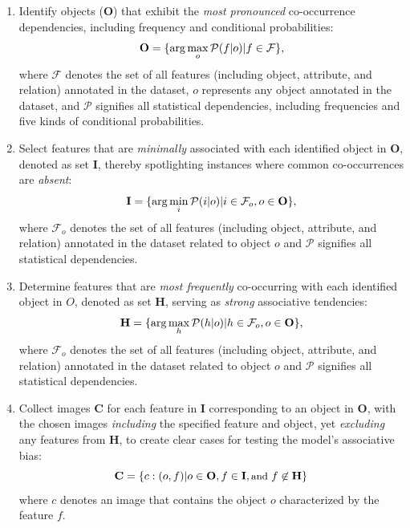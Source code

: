 \begin{enumerate}
    \item Identify objects ($\mathbf{O}$) that exhibit the \textit{most pronounced} co-occurrence dependencies, including frequency and conditional probabilities:
    \begin{equation}
        \small
        \mathbf{O} = \{\arg \max_{o} \mathcal{P}(f|o) | f \in \mathcal{F}\},
    \end{equation}
    where $\mathcal{F}$ denotes the set of all features (including object, attribute, and relation) annotated in the dataset, $o$ represents any object annotated in the dataset, and $\mathcal{P}$ signifies all statistical dependencies, including frequencies and five kinds of conditional probabilities.
    
    \item Select features that are \textit{minimally} associated with each identified object in $\mathbf{O}$, denoted as set $\mathbf{I}$,  thereby spotlighting instances where common co-occurrences are \textit{absent}:
    \begin{equation}
        \small
        \mathbf{I} = \{\arg \min_{i} \mathcal{P}(i|o) | i \in \mathcal{F}_o, o \in \mathbf{O} \},
    \end{equation}
    where $\mathcal{F}_o$ denotes the set of all features (including object, attribute, and relation) annotated in the dataset related to object $o$ and $\mathcal{P}$ signifies all statistical dependencies.
    
    \item Determine features that are \textit{most frequently} co-occurring with each identified object in $O$, denoted as set $\mathbf{H}$, serving as \textit{strong} associative tendencies:
    \begin{equation}
        \small
        \mathbf{H} = \{\arg \max_{h} \mathcal{P}(h|o) | h \in \mathcal{F}_o, o \in \mathbf{O} \},
    \end{equation}
    where $\mathcal{F}_o$ denotes the set of all features (including object, attribute, and relation) annotated in the dataset related to object $o$ and $\mathcal{P}$ signifies all statistical dependencies.
    
    \item Collect images $\mathbf{C}$ for each feature in $\mathbf{I}$ corresponding to an object in $\mathbf{O}$, with the chosen images \textit{including} the specified feature and object, yet \textit{excluding} any features from $\mathbf{H}$, to create clear cases for testing the model's associative bias:
    \begin{equation}
        \small
        \mathbf{C} = \{c: (o,f) | o \in \mathbf{O}, f \in \mathbf{I}, \text{and } f \not\in \mathbf{H}\}
    \end{equation}
    where $c$ denotes an image that contains the object $o$ characterized by the feature $f$.
\end{enumerate}

